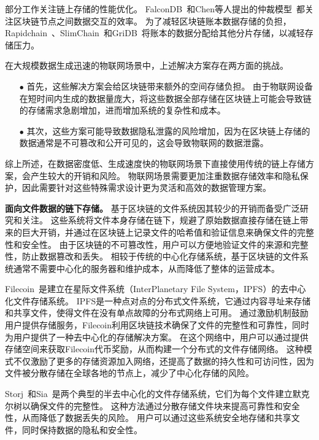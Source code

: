 部分工作关注链上存储的性能优化。
FalconDB~\cite{peng2020falcondb}和Chen等人提出的仲裁模型~\cite{chen2022blockchain}都关注区块链节点之间数据交互的效率。
为了减轻区块链账本数据存储的负担，Rapidchain~\cite{zamani2018rapidchain}、SlimChain~\cite{xu2021slimchain}和GriDB~\cite{hong2023gridb}将账本的数据分配给其他分片存储，以减轻存储压力。

在大规模数据生成迅速的物联网场景中，上述解决方案存在两方面的挑战。

\begin{itemize}
    \item[$\bullet$] 首先，这些解决方案会给区块链带来额外的空间存储负担。
    由于物联网设备在短时间内生成的数据量庞大，将这些数据全部存储在区块链上可能会导致链的存储需求急剧增加，进而增加系统的复杂性和成本。
    \item[$\bullet$] 其次，这些方案可能导致数据隐私泄露的风险增加，因为在区块链上存储的数据通常是不可篡改和公开可见的，这会导致物联网的数据泄露。
\end{itemize}

综上所述，在数据密度低、生成速度快的物联网场景下直接使用传统的链上存储方案，会产生较大的开销和风险。
物联网场景需要更加注重数据存储效率和隐私保护，因此需要针对这些特殊需求设计更为灵活和高效的数据管理方案。

\textbf{面向文件数据的链下存储。}
基于区块链的文件系统因其较少的开销而备受广泛研究和关注。
这些系统将文件本身存储在链下，规避了原始数据直接存储在链上带来的巨大开销，并通过在区块链上记录文件的哈希值和验证信息来确保文件的完整性和安全性。
由于区块链的不可篡改性，用户可以方便地验证文件的来源和完整性，防止数据篡改和丢失。
相较于传统的中心化存储系统，基于区块链的文件系统通常不需要中心化的服务器和维护成本，从而降低了整体的运营成本。

Filecoin~\cite{bauer2022filecoin}是建立在星际文件系统（InterPlanetary File System，IPFS）的去中心化文件存储系统。
IPFS是一种点对点的分布式文件系统，它通过内容寻址来存储和共享文件，使得文件在没有单点故障的分布式网络上可用。
通过激励机制鼓励用户提供存储服务，Filecoin利用区块链技术确保了文件的完整性和可靠性，同时为用户提供了一种去中心化的存储解决方案。
在这个网络中，用户可以通过提供存储空间来获取Filecoin代币奖励，从而构建一个分布式的文件存储网络。
这种模式不仅激励了更多的存储资源加入网络，还提高了数据的持久性和可访问性，因为文件被分散存储在全球各地的节点上，减少了中心化存储的风险。

Storj~\cite{storj2018storj}和Sia~\cite{vorick2014sia}是两个典型的半去中心化的文件存储系统，它们为每个文件建立默克尔树以确保文件的完整性。
这种方法通过分散存储文件块来提高可靠性和安全性，从而降低了数据丢失的风险。
用户可以通过这些系统安全地存储和共享文件，同时保持数据的隐私和安全性。

